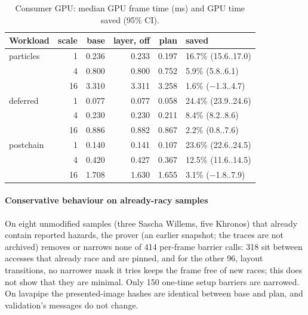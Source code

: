 \documentclass[acmtog,anonymous,review]{acmart}
\begin{document}
\begin{table}[t]
\caption{Consumer GPU: median GPU frame time (ms) and GPU time saved (95\% CI).}
\label{tab:s-speedup}
\small
\begin{tabular}{@{}lrrrrl@{}}
\toprule
Workload & scale & base & layer, off & plan & saved \\
\midrule
particles & 1 & 0.236 & 0.233 & 0.197 & 16.7\% (15.6..17.0) \\
 & 4 & 0.800 & 0.800 & 0.752 & 5.9\% (5.8..6.1) \\
 & 16 & 3.310 & 3.311 & 3.258 & 1.6\% ($-$1.3..4.7) \\
deferred & 1 & 0.077 & 0.077 & 0.058 & 24.4\% (23.9..24.6) \\
 & 4 & 0.230 & 0.230 & 0.211 & 8.4\% (8.2..8.6) \\
 & 16 & 0.886 & 0.882 & 0.867 & 2.2\% (0.8..7.6) \\
postchain & 1 & 0.140 & 0.141 & 0.107 & 23.6\% (22.6..24.5) \\
 & 4 & 0.420 & 0.427 & 0.367 & 12.5\% (11.6..14.5) \\
 & 16 & 1.708 & 1.630 & 1.655 & 3.1\% ($-$1.8..7.9) \\
\bottomrule
\end{tabular}
\end{table}

\paragraph{Conservative behaviour on already-racy samples}
On eight unmodified samples (three Sascha Willems, five Khronos) that already contain reported hazards, the prover
(an earlier snapshot; the traces are not archived) removes or narrows none of 414 per-frame barrier calls: 318 sit
between accesses that already race and are pinned, and for the other 96, layout transitions, no narrower mask it tries
keeps the frame free of new races; this does not show that they are minimal. Only 150 one-time setup barriers are
narrowed. On lavapipe the presented-image hashes are identical between
base and plan, and validation's messages do not change.
\end{document}
